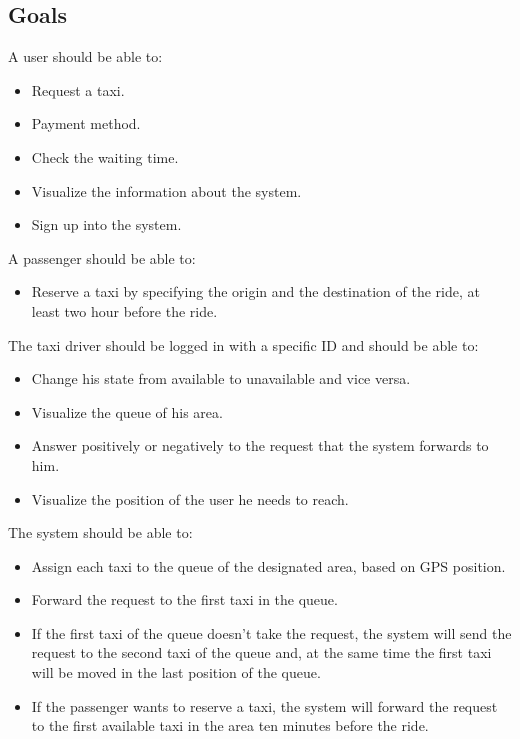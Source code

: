 \documentclass[18pt,oneside,a4paper, titlepage]{article}
\begin{document}
	\subsection{Goals}
	A user should be able to:
	\begin{itemize}
		\item Request a taxi.
		\item Payment method.
		\item Check the waiting time.
		\item Visualize the information about the system.
		\item Sign up into the system.
	\end{itemize}
	A passenger should be able to:
	\begin{itemize}
		\item Reserve a taxi by specifying the origin and the destination of the ride, at least two hour before the ride.
	\end{itemize}
	The taxi driver should be logged in with a specific ID and should be able to:
	\begin{itemize}
		\item Change his state from available to unavailable and vice versa.
		\item Visualize the queue of his area.
		\item Answer positively or negatively to the request that the system forwards to him.
		\item Visualize the position of the user he needs to reach.
	\end{itemize}
	The system should be able to:
	\begin{itemize}
		\item Assign each taxi to the queue of the designated area, based on GPS position.
		\item Forward the request to the first taxi in the queue.
		\item If the first taxi of the queue doesn't take the request, the system will send the request to the second taxi of the queue and, at the same time the first taxi will be moved in the last position of the queue.
		\item If the passenger wants to reserve a taxi, the system will forward the request to the first available taxi in the area ten minutes before the ride.
	\end{itemize}
	
\end{document}
